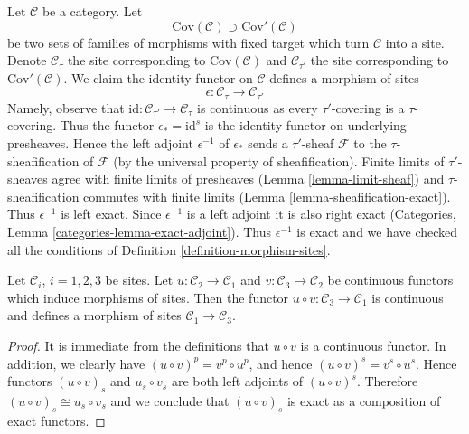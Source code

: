 \begin{example}
\label{example-finer-topology}
Let $\mathcal{C}$ be a category. Let
$$
\text{Cov}(\mathcal{C}) \supset \text{Cov}'(\mathcal{C})
$$
be two sets of families of morphisms with fixed target
which turn $\mathcal{C}$ into a site. Denote $\mathcal{C}_\tau$
the site corresponding to $\text{Cov}(\mathcal{C})$ and
$\mathcal{C}_{\tau'}$ the site corresponding to $\text{Cov}'(\mathcal{C})$.
We claim the identity functor on $\mathcal{C}$ defines a morphism of sites
$$
\epsilon : \mathcal{C}_\tau \longrightarrow \mathcal{C}_{\tau'}
$$
Namely, observe that $\text{id} : \mathcal{C}_{\tau'} \to \mathcal{C}_\tau$
is continuous as every
$\tau'$-covering is a $\tau$-covering. Thus the functor
$\epsilon_* = \text{id}^s$ is the identity functor on underlying
presheaves. Hence the left adjoint $\epsilon^{-1}$
of $\epsilon_*$ sends a $\tau'$-sheaf $\mathcal{F}$
to the $\tau$-sheafification of $\mathcal{F}$ (by the
universal property of sheafification).
Finite limits of $\tau'$-sheaves agree with finite limits
of presheaves (Lemma \ref{lemma-limit-sheaf}) and $\tau$-sheafification
commutes with finite limits (Lemma \ref{lemma-sheafification-exact}).
Thus $\epsilon^{-1}$ is left exact. Since $\epsilon^{-1}$
is a left adjoint it is also right exact
(Categories, Lemma \ref{categories-lemma-exact-adjoint}).
Thus $\epsilon^{-1}$ is exact and we have checked all the
conditions of Definition \ref{definition-morphism-sites}.
\end{example}

\begin{lemma}
\label{lemma-composition-morphisms-sites}
Let $\mathcal{C}_i$, $i = 1, 2, 3$ be sites. Let
$u : \mathcal{C}_2 \to \mathcal{C}_1$ and
$v : \mathcal{C}_3 \to \mathcal{C}_2$ be continuous functors
which induce morphisms of sites. Then the functor
$u \circ v : \mathcal{C}_3 \to \mathcal{C}_1$ is continuous and
defines a morphism of sites $\mathcal{C}_1 \to \mathcal{C}_3$.
\end{lemma}

\begin{proof}
It is immediate from the definitions that $u \circ v$ is a continuous functor.
In addition, we clearly have $(u \circ v)^p = v^p \circ u^p$, and hence
$(u \circ v)^s = v^s \circ u^s$. Hence functors $(u \circ v)_s$  and
$u_s \circ v_s$ are both left adjoints of $(u \circ v)^s$. Therefore
$(u \circ v)_s \cong u_s \circ v_s$ and we conclude that $(u \circ v)_s$
is exact as a composition of exact functors.
\end{proof}


